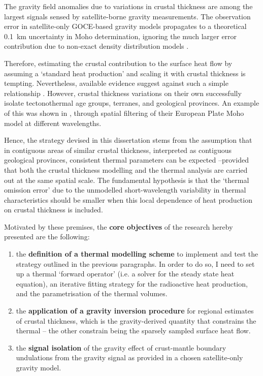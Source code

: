 The gravity field anomalies due to variations in crustal thickness are among the largest signals sensed by satellite-borne gravity measurements.
The observation error in satellite-only GOCE-based gravity models propagates to a theoretical \SI{0.1}{\kilo \metre} uncertainty in Moho determination, ignoring the much larger error contribution due to non-exact density distribution models \parencite{braitenberg2011goce}.

Therefore, estimating the crustal contribution to the surface heat flow by assuming a `standard heat production' and scaling it with crustal thickness is tempting.
Nevertheless, available evidence suggest against such a simple relationship \parencites{Mareschal2013}{Alessio2018deepRHP}.
However, crustal thickness variations on their own successfully isolate tectonothermal age groups, terranes, and geological provinces.
An example of this was shown in \textcite{Grad2009}, through spatial filtering of their European Plate Moho model at different wavelengths.

Hence, the strategy devised in this dissertation stems from the assumption that in contiguous areas of similar crustal thickness, interpreted as contiguous geological provinces, consistent thermal parameters can be expected --provided that both the crustal thickness modelling and the thermal analysis are carried out at the same spatial scale.
The fundamental hypothesis is that the `thermal omission error' due to the unmodelled short-wavelength variability in thermal characteristics should be smaller when this local dependence of heat production on crustal thickness is included.

Motivated by these premises, the \textbf{core objectives} of the research hereby presented are the following:
\begin{enumerate}
    \item the \textbf{definition of a thermal modelling scheme} to implement and test the strategy outlined in the previous paragraphs. In order to do so, I need to set up a thermal `forward operator' (i.e. a solver for the steady state heat equation), an iterative fitting strategy for the radioactive heat production, and the parametrisation of the thermal volumes.
    \item the \textbf{application of a gravity inversion procedure} for regional estimates of crustal thickness, which is the gravity-derived quantity that constrains the thermal -- the other constrain being the sparsely sampled surface heat flow.
    \item the \textbf{signal isolation} of the gravity effect of crust-mantle boundary undulations from the gravity signal as provided in a chosen satellite-only gravity model.
\end{enumerate}

